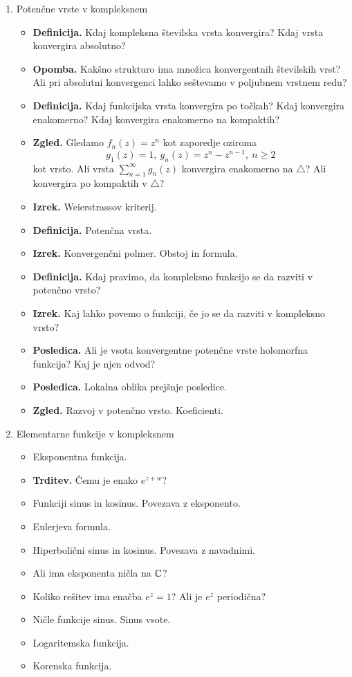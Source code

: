 \begin{enumerate}
    \item Potenčne vrste v kompleksnem
    \begin{itemize}
        \item \textbf{Definicija.} Kdaj kompleksna številska vrsta konvergira? Kdaj vrsta konvergira absolutno?
        \item \textbf{Opomba.} Kakšno strukturo ima množica konvergentnih številskih vrst? Ali pri absolutni konvergenci lahko seštevamo v poljubnem vrstnem redu?
        \item \textbf{Definicija.} Kdaj funkcijska vrsta konvergira po točkah? Kdaj konvergira enakomerno? Kdaj konvergira enakomerno na kompaktih?
        \item \textbf{Zgled.} Gledamo \(f_n(z) = z^n\) kot zaporedje oziroma 
        \[g_1(z) = 1, \ g_n(z) = z^n - z^{n-1}, \ n \geq 2\]
        kot vrsto. Ali vrsta \(\sum_{n=1}^{\infty} g_n(z)\) konvergira enakomerno na \(\triangle\)? Ali konvergira po kompaktih v \(\triangle\)? 
        \item \textbf{Izrek.} Weierstrassov kriterij.
        \item \textbf{Definicija.} Potenčna vrsta.
        \item \textbf{Izrek.} Konvergenčni polmer. Obstoj in formula.
        \item \textbf{Definicija.} Kdaj pravimo, da kompleksno funkcijo se da razviti v potenčno vrsto?
        \item \textbf{Izrek.} Kaj lahko povemo o funkciji, če jo se da razviti v kompleksno vrsto?
        \item \textbf{Posledica.} Ali je vsota konvergentne potenčne vrste holomorfna funkcija? Kaj je njen odvod?
        \item \textbf{Posledica.} Lokalna oblika prejšnje posledice.
        \item \textbf{Zgled.} Razvoj v potenčno vrsto. Koeficienti.
    \end{itemize}

    \item Elementarne funkcije v kompleksnem
    \begin{itemize}
        \item Eksponentna funkcija.
        \item \textbf{Trditev.} Čemu je enako \(e^{z+w}\)?
        \item Funkciji sinus in kosinus. Povezava z eksponento. 
        \item Eulerjeva formula.
        \item Hiperbolični sinus in kosinus. Povezava z navadnimi.
        \item Ali ima eksponenta ničla na \(\mathbb{C}\)?
        \item Koliko rešitev ima enačba \(e^z=1\)? Ali je \(e^z\) periodična?
        \item Ničle funkcije sinus. Sinus vsote.
        \item Logaritemska funkcija.
        \item Korenska funkcija.
    \end{itemize}

\end{enumerate}